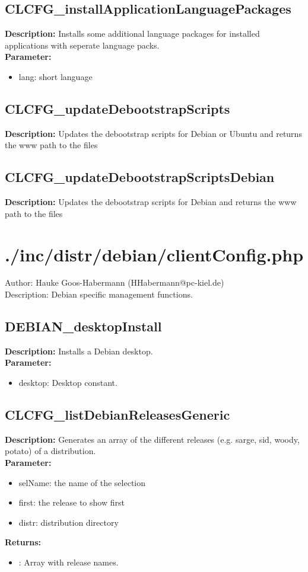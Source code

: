 \subsection{CLCFG\_installApplicationLanguagePackages}
\textbf{Description:} Installs some additional language packages for installed applications with seperate language packs.\\
\textbf{Parameter:}
\begin{itemize}
\item lang: short language
\end{itemize}

\subsection{CLCFG\_updateDebootstrapScripts}
\textbf{Description:} Updates the debootstrap scripts for Debian or Ubuntu and returns the www path to the files\\

\subsection{CLCFG\_updateDebootstrapScriptsDebian}
\textbf{Description:} Updates the debootstrap scripts for Debian and returns the www path to the files\\

\newpage\section{./inc/distr/debian/clientConfig.php}
 Author: Hauke Goos-Habermann (HHabermann@pc-kiel.de)\\
 Description: Debian specific management functions.\\

\subsection{DEBIAN\_desktopInstall}
\textbf{Description:} Installs a Debian desktop.\\
\textbf{Parameter:}
\begin{itemize}
\item desktop: Desktop constant.
\end{itemize}

\subsection{CLCFG\_listDebianReleasesGeneric}
\textbf{Description:} Generates an array of the different releases (e.g. sarge, sid, woody, potato) of a distribution.\\
\textbf{Parameter:}
\begin{itemize}
\item selName: the name of the selection
\item first: the release to show first
\item distr: distribution directory
\end{itemize}
\textbf{Returns:}
\begin{itemize}
\item : Array with release names.
\end{itemize}

